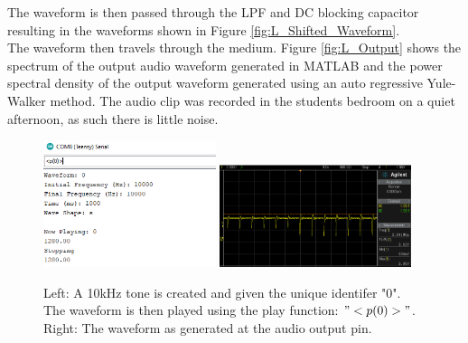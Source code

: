 The waveform is then passed through the LPF and DC blocking capacitor resulting in the waveforms shown in Figure \ref{fig:L_Shifted_Waveform}. \\

The waveform then travels through the medium. Figure \ref{fig:L_Output} shows the spectrum of the output audio waveform generated in MATLAB and the power spectral density of the output waveform generated using an auto regressive Yule-Walker method. The audio clip was recorded in the students bedroom on a quiet afternoon, as such there is little noise. \\

\begin{figure} [!htb]
	\captionsetup{justification=centering}
	\hfill\includegraphics[width=0.45\textwidth]{./images/speaker/L_Create_Waveform}\hspace{\fill}
	\includegraphics[width=0.5\textwidth]{./images/speaker/L_Generated_Sinusoidal_PWM}\hspace{\fill}
	\caption{Left: A 10kHz tone is created and given the unique identifer "0". The waveform is then played using the play function: $"<p(0)>"$. Right: The waveform as generated at the audio output pin.}
	\label{fig:L_Create_Waveform}
\end{figure}

